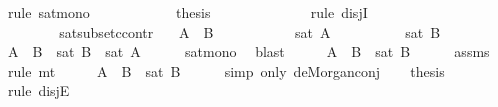 \begin{isabellebody}
\ {\isacharparenleft}rule\ sat{\isacharunderscore}mono{\isacharparenright}\isanewline
\ \ \ \ \ \ \ \ \ \ \isamarkupfalse%
\ {\isacharquery}thesis\isanewline
\ \ \ \ \ \ \ \ \ \ \ \ \isamarkupfalse%
\ {\isacharparenleft}rule\ disjI{}{\isacharparenright}\isanewline
\ \ \ \ \ \ \ \ \isamarkupfalse%
\isanewline
\ \ \ \ \ \ \isamarkupfalse%
\isanewline
\ \ \ \ \isamarkupfalse%
\isanewline
\ \ \isamarkupfalse%
\isanewline
{}\isamarkupfalse%
%
\endisatagproof
{\isafoldproof}%
%
\isadelimproof
\isanewline
%
\endisadelimproof
\isanewline
{}\isamarkupfalse%
\ sat{\isacharunderscore}subset{\isacharunderscore}ccontr{\isacharcolon}\isanewline
\ \ \ {\isachardoublequoteopen}A\ {\isasymsubseteq}\ B{\isachardoublequoteclose}\isanewline
\ \ \ \ \ \ \ \ \ \ {\isachardoublequoteopen}{\isasymnot}\ sat\ A{\isachardoublequoteclose}\isanewline
\ \ \ \ \ \ \ \ \ {\isachardoublequoteopen}{\isasymnot}\ sat\ B{\isachardoublequoteclose}\isanewline
%
\isadelimproof
%
\endisadelimproof
%
\isatagproof
{}\isamarkupfalse%
\ {\isacharminus}\isanewline
\ \ \isamarkupfalse%
\ {\isachardoublequoteopen}A\ {\isasymsubseteq}\ B\ {\isasymand}\ sat\ B\ {\isasymlongrightarrow}\ sat\ A{\isachardoublequoteclose}\isanewline
\ \ \ \ \isamarkupfalse%
\ sat{\isacharunderscore}mono\ \isamarkupfalse%
\ blast\isanewline
\ \ \isamarkupfalse%
\ \isamarkupfalse%
\ {\isachardoublequoteopen}{\isasymnot}{\isacharparenleft}A\ {\isasymsubseteq}\ B\ {\isasymand}\ sat\ B{\isacharparenright}{\isachardoublequoteclose}\isanewline
\ \ \ \ \isamarkupfalse%
\ assms{\isacharparenleft}{}{\isacharparenright}\ \isamarkupfalse%
\ {\isacharparenleft}rule\ mt{\isacharparenright}\isanewline
\ \ \isamarkupfalse%
\ \isamarkupfalse%
\ {\isachardoublequoteopen}{\isasymnot}{\isacharparenleft}A\ {\isasymsubseteq}\ B{\isacharparenright}\ {\isasymor}\ {\isasymnot}{\isacharparenleft}sat\ B{\isacharparenright}{\isachardoublequoteclose}\isanewline
\ \ \ \ \isamarkupfalse%
\ {\isacharparenleft}simp\ only{\isacharcolon}\ de{\isacharunderscore}Morgan{\isacharunderscore}conj{\isacharparenright}\isanewline
\ \ \isamarkupfalse%
\ {\isacharquery}thesis\isanewline
\ \ \isamarkupfalse%
\ {\isacharparenleft}rule\ disjE{\isacharparenright}\isanewline
\ \ \ \ \isamarkupfalse%

\end{isabellebody}
